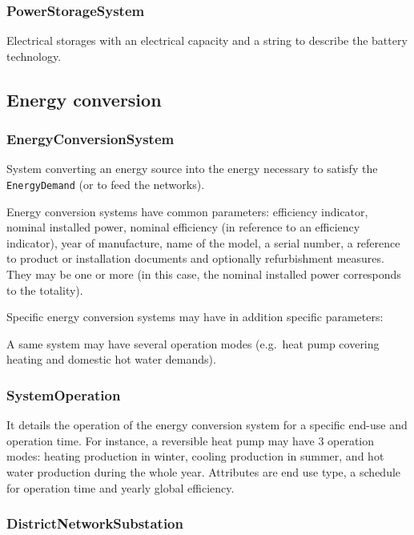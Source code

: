 \documentclass[a4paper,12pt]{article}
\begin{document}
\subsubsection{PowerStorageSystem}\label{powerstoragesystem}

Electrical storages with an electrical capacity and a string to describe
the battery technology.

\subsection{Energy conversion}\label{energy-conversion}

\subsubsection{EnergyConversionSystem}\label{energyconversionsystem}

System converting an energy source into the energy necessary to satisfy
the \lstinline!EnergyDemand! (or to feed the networks).

Energy conversion systems have common parameters: efficiency indicator,
nominal installed power, nominal efficiency (in reference to an
efficiency indicator), year of manufacture, name of the model, a serial
number, a reference to product or installation documents and optionally
refurbishment measures. They may be one or more (in this case, the
nominal installed power corresponds to the totality).

Specific energy conversion systems may have in addition specific
parameters:

A same system may have several operation modes (e.g.~heat pump covering
heating and domestic hot water demands).

\subsubsection{SystemOperation}\label{systemoperation}

It details the operation of the energy conversion system for a specific
end-use and operation time. For instance, a reversible heat pump may
have 3 operation modes: heating production in winter, cooling production
in summer, and hot water production during the whole year. Attributes
are end use type, a schedule for operation time and yearly global
efficiency.

\subsubsection{DistrictNetworkSubstation}\label{districtnetworksubstation}
\end{document}
